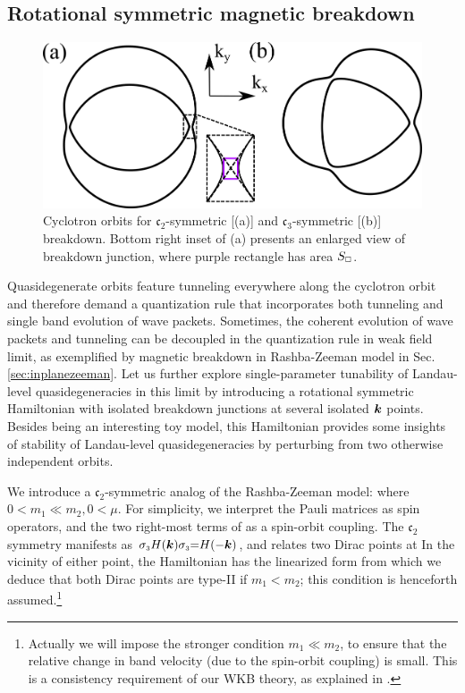 \documentclass[aps, prb, showpacs, twocolumn, notitlepage, superscriptaddress]{revtex4-1}
\begin{document}
\subsection{Rotational symmetric magnetic breakdown}

\begin{figure}
\includegraphics[width=1.0\columnwidth]{Cn-breakdown.png}
\caption{Cyclotron orbits for $\mathfrak{c}_2$-symmetric [(a)] and $\mathfrak{c}_3$-symmetric [(b)] breakdown. Bottom right inset of (a) presents an enlarged view of breakdown junction, where purple rectangle has area $S_{\scriptscriptstyle{\square}}$.\label{fig:Cn-breakdown}}
\end{figure}

Quasidegenerate orbits feature tunneling everywhere along the cyclotron orbit and therefore demand a quantization rule that incorporates both tunneling and single band evolution of wave packets. Sometimes, the coherent evolution of wave packets and tunneling can be decoupled in the quantization rule in weak field limit, as exemplified by magnetic breakdown in Rashba-Zeeman model in Sec. \ref{sec:inplanezeeman}. Let us further explore single-parameter tunability of Landau-level quasidegeneracies in this limit by introducing a rotational symmetric Hamiltonian with isolated breakdown junctions at several isolated $\boldsymbol{k}$ points. Besides being an interesting toy model, this Hamiltonian provides some insights of stability of Landau-level quasidegeneracies by perturbing from two otherwise independent orbits.

We introduce a $\mathfrak{c}_2$-symmetric analog of the Rashba-Zeeman model:
where $0<m_1{\ll}m_2,0<\mu$. For simplicity, we interpret the Pauli matrices as  spin operators, and the two right-most terms of   as a spin-orbit coupling. The $\mathfrak{c}_2$ symmetry manifests as $\sigma_{\scriptscriptstyle{3}} H(\boldsymbol{k})\sigma_{\scriptscriptstyle{3}}{=}H({-}\boldsymbol{k})$, and relates 
two Dirac points at
In the vicinity of either point, the  Hamiltonian has the linearized form 
from which we deduce that both Dirac points are  type-II if $m_1{<}m_2$; this condition is henceforth assumed.\footnote{Actually we will impose the stronger condition $m_1{\ll}m_2$, to ensure that the relative change in band velocity (due to the spin-orbit coupling) is small. This is a consistency requirement of our WKB theory, as explained in .} 
\end{document}
